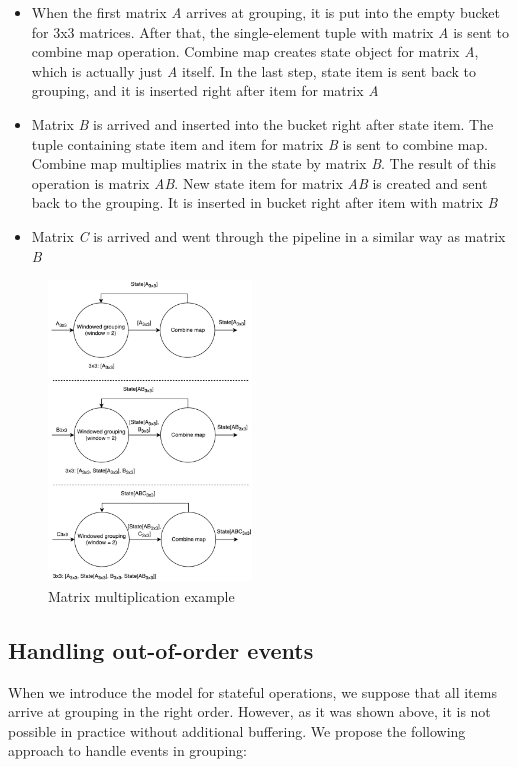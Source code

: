 \begin{itemize}
    \item When the first matrix {\it A} arrives at grouping, it is put into the empty bucket for 3x3 matrices. After that, the single-element tuple with matrix {\it A} is sent to combine map operation. Combine map creates state object for matrix {\it A}, which is actually just {\it A} itself. In the last step, state item is sent back to grouping, and it is inserted right after item for matrix {\it A}
    \item Matrix {\it B} is arrived and inserted into the bucket right after state item. The tuple containing state item and item for matrix {\it B} is sent to combine map. Combine map multiplies matrix in the state by matrix {\it B}. The result of this operation is matrix {\it AB}. New state item for matrix {\it AB} is created and sent back to the grouping. It is inserted in bucket right after item with matrix {\it B}
    \item Matrix {\it C} is arrived and went through the pipeline in a similar way as matrix {\it B}
\end{itemize}

\begin{figure}[htbp]
  \centering
  \includegraphics[width=0.48\textwidth]{pics/matrix-example}
  \caption{Matrix multiplication example}
  \label {matrix-example}
\end{figure}

\subsection{Handling out-of-order events}
When we introduce the model for stateful operations, we suppose that all items arrive at grouping in the right order. However, as it was shown above, it is not possible in practice without additional buffering. We propose the following approach to handle events in grouping:

